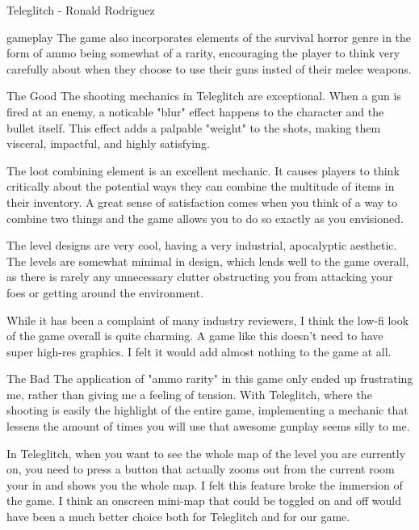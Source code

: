 \documentclass[12pt]{report}
\begin{document}
\begin{section}{Teleglitch - Ronald Rodriguez}
\begin{subsection}{gameplay}
The game also incorporates elements of the survival horror genre in the form of 
ammo being somewhat of a rarity, encouraging the player to think very carefully 
about when they choose to use their guns insted of their melee weapons.
\end{subsection}

\begin{subsection}{The Good}
The shooting mechanics in Teleglitch are exceptional. When a gun is fired at an 
enemy, a noticable "blur" effect happens to the character and the bullet itself. 
This effect adds a palpable "weight" to the shots, making them visceral, impactful, 
and highly satisfying. 

The loot combining element is an excellent mechanic. It causes players to think 
critically about the potential ways they can combine the multitude of items in their 
inventory. A great sense of satisfaction comes when you think of a way to combine 
two things and the game allows you to do so exactly as you envisioned. 

The level designs are very cool, having a very industrial, apocalyptic aesthetic. 
The levels are somewhat minimal in design, which lends well to the game overall, as 
there is rarely any unnecessary clutter obstructing you from attacking your foes or 
getting around the environment. 

While it has been a complaint of many industry reviewers, I think the low-fi look of 
the game overall is quite charming. A game like this doesn't need to have super high-res 
graphics. I felt it would add almost nothing to the game at all. 

\end{subsection}

\begin{subsection}{The Bad}
The application of "ammo rarity" in this game only ended up frustrating me, rather than 
giving me a feeling of tension. With Teleglitch, where the shooting is easily the highlight of 
the entire game, implementing a mechanic that lessens the amount of times you will use that 
awesome gunplay seems silly to me. 

In Teleglitch, when you want to see the whole map of the level you are currently on, you need 
to press a button that actually zooms out from the current room your in and shows you the whole 
map. I felt this feature broke the immersion of the game. I think an onscreen mini-map that 
could be toggled on and off would have been a much better choice both for Teleglitch and for 
our game.

\end{subsection}

\end{section}
\end{document}
